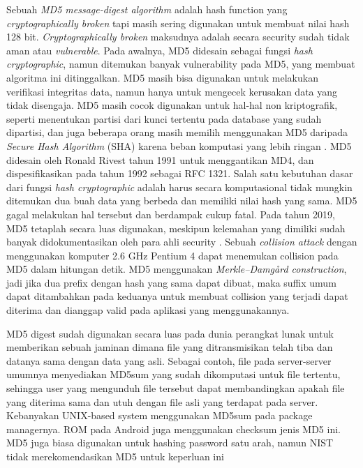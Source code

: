 Sebuah \emph{MD5 message-digest algorithm} adalah hash function yang \emph{cryptographically broken} tapi masih sering digunakan untuk membuat nilai hash 128 bit. \emph{Cryptographically broken} maksudnya adalah secara security sudah tidak aman atau \emph{vulnerable}. Pada awalnya, MD5 didesain sebagai fungsi \emph{hash cryptographic}, namun ditemukan banyak vulnerability pada MD5, yang membuat algoritma ini ditinggalkan. MD5 masih bisa digunakan untuk melakukan verifikasi integritas data, namun hanya untuk mengecek kerusakan data yang tidak disengaja. MD5 masih cocok digunakan untuk hal-hal non kriptografik, seperti menentukan partisi dari kunci tertentu pada database yang sudah dipartisi, dan juga beberapa orang masih memilih menggunakan MD5 daripada \emph{Secure Hash Algorithm} (SHA) karena beban komputasi yang lebih ringan \citep{martin2017}. MD5 didesain oleh Ronald Rivest tahun 1991 untuk menggantikan MD4, dan dispesifikasikan pada tahun 1992 sebagai RFC 1321. Salah satu kebutuhan dasar dari fungsi \emph{hash cryptographic} adalah harus secara komputasional tidak mungkin ditemukan dua buah data yang berbeda dan memiliki nilai hash yang sama. MD5 gagal melakukan hal tersebut dan berdampak cukup fatal. Pada tahun 2019, MD5 tetaplah secara luas digunakan, meskipun kelemahan yang dimiliki sudah banyak didokumentasikan oleh para ahli security \citep{md5vuln}. Sebuah \emph{collision attack} dengan menggunakan komputer 2.6 GHz Pentium 4 dapat menemukan collision pada MD5 dalam hitungan detik. MD5 menggunakan \emph{Merkle–Damgård construction}, jadi jika dua prefix dengan hash yang sama dapat dibuat, maka suffix umum dapat ditambahkan pada keduanya untuk membuat collision yang terjadi dapat diterima dan dianggap valid pada aplikasi yang menggunakannya.

MD5 digest sudah digunakan secara luas pada dunia perangkat lunak untuk memberikan sebuah jaminan dimana file yang ditransmisikan telah tiba dan datanya sama dengan data yang asli. Sebagai contoh, file pada server-server umumnya menyediakan MD5sum yang sudah dikomputasi untuk file tertentu, sehingga user yang mengunduh file tersebut dapat membandingkan apakah file yang diterima sama dan utuh dengan file asli yang terdapat pada server. Kebanyakan UNIX-based system menggunakan MD5sum pada package managernya. ROM pada Android juga menggunakan checksum jenis MD5 ini. MD5 juga biasa digunakan untuk hashing password satu arah, namun NIST tidak merekomendasikan MD5 untuk keperluan ini

